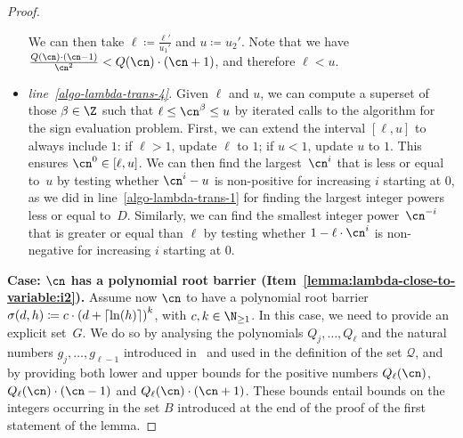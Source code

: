 \begin{proof}
\begin{itemize}
        We can then take $\ell \coloneqq \frac{\ell'}{u_1'}$ and $u \coloneqq u_2'$. 
        Note that we have $\frac{Q(\cn) \cdot (\cn-1)}{\cn^2} < Q(\cn) \cdot (\cn + 1)$, 
        and therefore $\ell < u$.
        \item \textit{line~\ref{algo-lambda-trans-4}.} Given $\ell$ and $u$, we can compute a superset of those $\beta \in \Z$ such that $\ell \leq \cn^\beta \leq u$ by iterated calls to the algorithm for the sign evaluation problem. First, we can extend the interval $[\ell,u]$ to always include $1$: if $\ell > 1$, update $\ell$ to $1$; if $u < 1$, update $u$ to $1$.
        This ensures $\cn^0 \in [\ell,u]$. We can then find the largest~$\cn^i$ that is less or equal to~$u$ by testing whether $\cn^i - u$ is non-positive for increasing $i$ starting at $0$, as we did in line~\ref{algo-lambda-trans-1} for finding the largest integer powers less or equal to~$D$. Similarly, we can find the smallest integer power~$\cn^{-i}$ that is greater or equal than $\ell$ by testing whether $1 - \ell \cdot \cn^{i}$ is non-negative for increasing $i$ starting at $0$.
    \end{itemize}
  
    \noindent
    \textbf{Case: $\cn$ has a polynomial root barrier (Item~\eqref{lemma:lambda-close-to-variable:i2}).}
    Assume now $\cn$ to have a polynomial root barrier 
    $\sigma(d,h) \coloneqq c \cdot {(d+\ensuremath{\left\lceil\ln(h)\right\rceil})}^k$, 
    with $c,k \in \N_{\geq 1}$.
    In this case, we need to provide an explicit set~$G$.
    We do so by analysing the polynomials 
    $Q_j,\dots,Q_\ell$
    and the natural numbers 
    $g_j,\dots,g_{\ell-1}$ 
    introduced in~
    and used in the definition of the set $\mathcal{Q}$,
    and by providing both lower and upper bounds for the positive numbers
    $Q_\ell(\cn)$,
    $Q_{\ell}(\cn) \cdot (\cn-1)$ and 
    $Q_{\ell}(\cn) \cdot (\cn+1)$.
    These bounds entail bounds on the integers occurring in the set $B$
    introduced at the end of the proof of the first statement of the lemma.


\end{proof}
